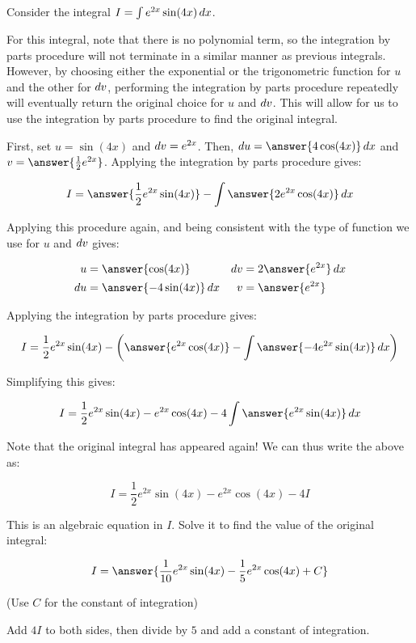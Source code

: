 \documentclass{ximera}
\author{Jim Talamo}
\begin{document}
\begin{exercise}
Consider the integral $I = \int e^{2x}\sin(4x) \mathop{}\!d x $.

For this integral, note that there is no polynomial term, so the integration by parts procedure will not terminate in a similar manner as previous integrals.  However, by choosing either the exponential or the trigonometric function for $u$ and the other for $\mathop{}\!d v$, performing the integration by parts procedure repeatedly will eventually return the original choice for $u$ and $\mathop{}\!d v$.  This will allow for us to use the integration by parts procedure to find the original integral.

First, set $u = \sin(4x)$ and $\mathop{}\!d v =  e^{2x}$.  Then, $\d u = \answer{4 \cos(4x)} \d x$ and $v = \answer{\frac{1}{2}e^{2x}}$.  Applying the integration by parts procedure gives:

\[
I = \answer{\frac{1}{2} e^{2x}\sin(4x)}-\int \answer{2 e^{2x}\cos(4x)} \d x
\] 

\begin{exercise}
Applying this procedure again, and being consistent with the type of function we use for $u$ and $\mathop{}\!d v$ gives:

\begin{align*}
u  &=  \answer{\cos(4x)} & \d v &= 2 \answer{e^{2x}} \d x \\
\d u &= \answer{-4\sin(4x)} \d x & v &= \answer{ e^{2x}}
\end{align*}

Applying the integration by parts procedure gives:

\[
I = \frac{1}{2}e^{2x}\sin(4x)-\left(\answer{e^{2x}\cos(4x)} - \int \answer{-4 e^{2x}\sin(4x)} \d x \right)
\] 

\begin{exercise}
Simplifying this gives:

\[
I = \frac{1}{2}e^{2x}\sin(4x)-e^{2x}\cos(4x) - 4 \int \answer{e^{2x}\sin(4x)} \d x 
\] 

Note that the original integral has appeared again!  We can thus write the above as:

\[
I = \frac{1}{2}e^{2x}\sin(4x)-e^{2x}\cos(4x) - 4 I 
\] 

This is an algebraic equation in $I$.  Solve it to find the value of the original integral:

\[
I = \answer{\frac{1}{10}e^{2x}\sin(4x)-\frac{1}{5}e^{2x}\cos(4x) +C}
\] 

(Use $C$ for the constant of integration)

\begin{hint}
Add $4I$ to both sides, then divide by $5$ and add a constant of integration.
\end{hint}


\end{exercise}
\end{exercise}
\end{exercise}
\end{document}
